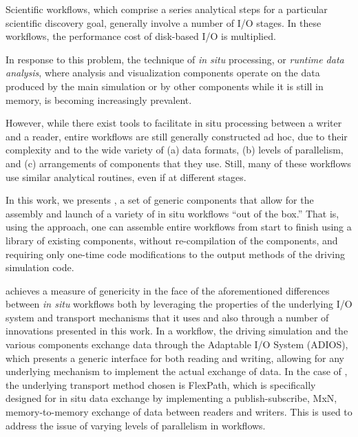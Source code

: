 Scientific workflows, which comprise a series analytical steps for a
particular scientific discovery goal, generally involve a number of
I/O stages. In these workflows, the performance cost of disk-based I/O
is multiplied.

In response to this problem, the technique of \textit{in situ}
processing, or \textit{runtime data analysis},
where analysis and visualization components
operate on the data produced by the main simulation
or by other components while it is still in memory,
is becoming increasingly prevalent.


However, while there exist tools to facilitate in situ
processing between a writer and a reader, 
entire workflows are still generally constructed ad hoc,
due to their complexity and to the wide variety of (a) data formats,
(b) levels of parallelism, and (c) arrangements of components that
they use. Still, many of these workflows use similar analytical
routines, even if at different stages.

In this work, we presents \sys, a set of
generic components that allow for the assembly
and launch of a variety of in situ workflows
``out of the box.''
That is, using the \sys approach, one can assemble
entire workflows from start to finish using a library
of existing components, without re-compilation of the
components, and requiring only one-time code modifications
to the output methods of the driving simulation code.


\sys achieves a measure of genericity in the face of
the aforementioned differences between
\textit{in situ} workflows both by
leveraging the properties of the underlying I/O
system and transport mechanisms that it uses
and also through a number of
innovations presented in this work.
In a \sys workflow, the driving simulation and
the various components exchange data through
the Adaptable I/O System (ADIOS),
which presents a generic interface for both
reading and writing, allowing for any underlying
mechanism to implement the actual exchange of data.
In the case of \sys, the underlying transport method
chosen is FlexPath, which is specifically designed for
in situ data exchange by implementing a publish-subscribe,
MxN, memory-to-memory exchange of data between readers
and writers. This is used to address the issue of
varying levels of parallelism in workflows.

